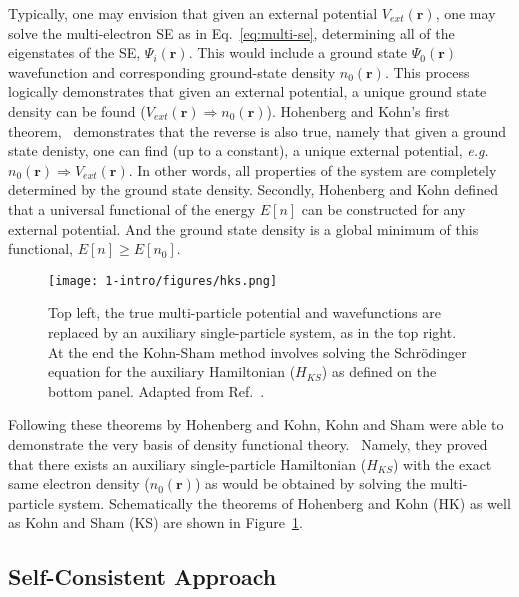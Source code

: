 Typically, one may envision that given an external potential $V_{ext}(\textbf{r})$, one may solve the multi-electron SE as in Eq.~\ref{eq:multi-se}, determining all of the eigenstates of the SE, $\Psi_i({\textbf{r}})$. This would include a ground state $\Psi_0({\textbf{r}})$ wavefunction and corresponding ground-state density $n_0(\textbf{r})$. This process logically demonstrates that given an external potential, a unique ground state density can be found ($V_{ext}(\textbf{r})\Rightarrow n_0(\textbf{r})$). Hohenberg and Kohn's first theorem,~\cite{hohenberg1964inhomogeneous} demonstrates that the reverse is also true, namely that given a ground state denisty, one can find (up to a constant), a unique external potential, \textit{e.g.}\ $n_0(\textbf{r}) \Rightarrow V_{ext}(\textbf{r})$. In other words, all properties of the system are completely determined by the ground state density. Secondly, Hohenberg and Kohn defined that a universal functional of the energy $E[n]$ can be constructed for any external potential. And the ground state density is a global minimum of this functional, $E[n]\geq E[n_0]$.


\begin{figure}[h]
\begin{center}
\texttt{[image: 1-intro/figures/hks.png]}
    \caption{Top left, the true multi-particle potential and wavefunctions are replaced by an auxiliary single-particle system, as in the top right. At the end the Kohn-Sham method involves solving the Schr{\"o}dinger equation for the auxiliary Hamiltonian ($H_{KS}$) as defined on the bottom panel. Adapted from Ref.~\cite{martin2020electronic}.}  \label{intro:fig:hks}
\end{center}
\end{figure}

Following these theorems by Hohenberg and Kohn, Kohn and Sham were able to demonstrate the very basis of density functional theory.~\cite{kohn1965self} Namely, they proved that there exists an auxiliary single-particle Hamiltonian ($H_{KS}$) with the exact same electron density ($n_0(\textbf{r})$) as would be obtained by solving the multi-particle system. Schematically the theorems of Hohenberg and Kohn (HK) as well as Kohn and Sham (KS) are shown in Figure~\ref{intro:fig:hks}.

\subsection{Self-Consistent Approach}

